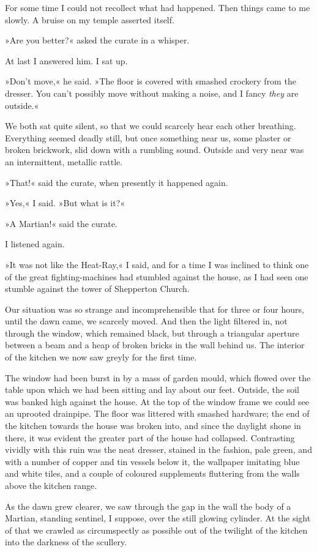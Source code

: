 For some time I could not recollect what had happened. Then things came to me slowly. A bruise on my temple asserted itself.

»Are you better?« asked the curate in a whisper.

At last I answered him. I sat up.

»Don't move,« he said. »The floor is covered with smashed crockery from the dresser. You can't possibly move without making a noise, and I fancy \textit{they} are outside.«

We both sat quite silent, so that we could scarcely hear each other breathing. Everything seemed deadly still, but once something near us, some plaster or broken brickwork, slid down with a rumbling sound. Outside and very near was an intermittent, metallic rattle.

»That!« said the curate, when presently it happened again.

»Yes,« I said. »But what is it?«

»A Martian!« said the curate.

I listened again.

»It was not like the Heat-Ray,« I said, and for a time I was inclined to think one of the great fighting-machines had stumbled against the house, as I had seen one stumble against the tower of Shepperton Church.

Our situation was so strange and incomprehensible that for three or four hours, until the dawn came, we scarcely moved. And then the light filtered in, not through the window, which remained black, but through a triangular aperture between a beam and a heap of broken bricks in the wall behind us. The interior of the kitchen we now saw greyly for the first time.

The window had been burst in by a mass of garden mould, which flowed over the table upon which we had been sitting and lay about our feet. Outside, the soil was banked high against the house. At the top of the window frame we could see an uprooted drainpipe. The floor was littered with smashed hardware; the end of the kitchen towards the house was broken into, and since the daylight shone in there, it was evident the greater part of the house had collapsed. Contrasting vividly with this ruin was the neat dresser, stained in the fashion, pale green, and with a number of copper and tin vessels below it, the wallpaper imitating blue and white tiles, and a couple of coloured supplements fluttering from the walls above the kitchen range.

As the dawn grew clearer, we saw through the gap in the wall the body of a Martian, standing sentinel, I suppose, over the still glowing cylinder. At the sight of that we crawled as circumspectly as possible out of the twilight of the kitchen into the darkness of the scullery.

